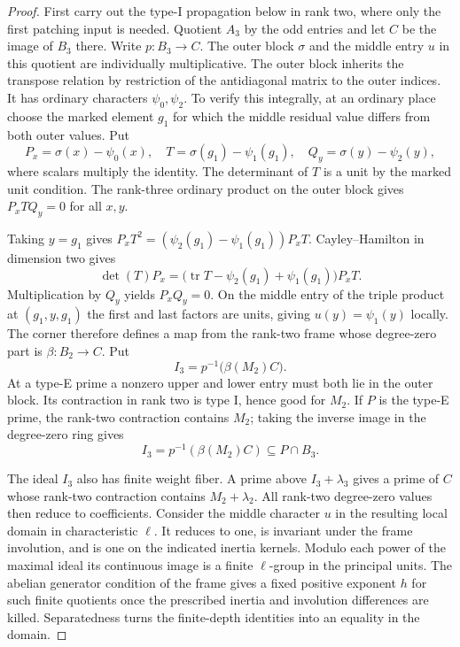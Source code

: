 \begin{proof}
First carry out the type-I propagation below in rank two,
where only the first patching input is needed. Quotient
\(A_3\) by the odd entries and let \(C\) be the image of
\(B_3\) there. Write \(p:B_3\to C\). The outer block
\(\sigma\) and the middle entry \(u\) in this quotient are
individually multiplicative. The outer block inherits the
transpose relation by restriction of the antidiagonal matrix
to the outer indices. It has ordinary characters \(\psi_0,\psi_2\).
To verify this integrally, at an ordinary place choose the marked
element \(g_1\) for which the middle residual value differs
from both outer values. Put
\[
 P_x=\sigma(x)-\psi_0(x),\quad
 T=\sigma(g_1)-\psi_1(g_1),\quad Q_y=\sigma(y)-\psi_2(y),
\]
where scalars multiply the identity. The determinant of \(T\)
is a unit by the marked unit condition. The rank-three ordinary
product on the outer block gives \(P_xTQ_y=0\) for all \(x,y\).

Taking \(y=g_1\) gives
\(P_xT^2=(\psi_2(g_1)-\psi_1(g_1))P_xT\).
Cayley--Hamilton in dimension two gives
\[
  \det(T)P_x =
    \bigl(\operatorname{tr}T-\psi_2(g_1)+\psi_1(g_1)\bigr)P_xT .
\]
Multiplication by \(Q_y\) yields \(P_xQ_y=0\). On the middle
entry of the triple product at \((g_1,y,g_1)\) the first and
last factors are units, giving \(u(y)=\psi_1(y)\) locally.
The corner therefore defines a map from the rank-two frame
whose degree-zero part is \(\beta:B_2\to C\). Put
\[
                        I_3=p^{-1}\bigl(\beta(M_2)C\bigr).
\]
At a type-E prime a nonzero upper and lower entry must both
lie in the outer block. Its contraction in rank two is type I,
hence good for \(M_2\). If \(P\) is the type-E prime, the rank-two contraction contains \(M_2\); taking the inverse image in the degree-zero ring gives 
\[
 I_3=p^{-1}(\beta(M_2)C)\subseteq P\cap B_3.
\]


The ideal \(I_3\) also has finite weight fiber. A prime above
\(I_3+\lambda_3\) gives a prime of \(C\) whose rank-two
contraction contains \(M_2+\lambda_2\). All rank-two degree-zero
values then reduce to coefficients. Consider the middle character
\(u\) in the resulting local domain in characteristic \(\ell\).
It reduces to one, is invariant under the frame involution, and
is one on the indicated inertia kernels. Modulo each power of the
maximal ideal its continuous image is a finite \(\ell\)-group in
the principal units. The abelian generator condition of the frame
gives a fixed positive exponent \(h\) for such finite quotients
once the prescribed inertia and involution differences are killed.
Separatedness turns the finite-depth identities into an equality in the domain.


\end{proof}
